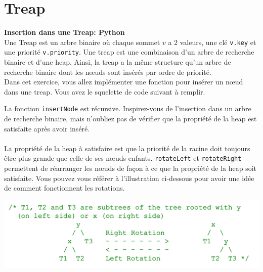 \section{Treap}
\begin{Exercice}[20 minutes]\textbf{Insertion dans une Treap: Python} \optionnel\\
    Une Treap est un arbre binaire où chaque sommet $v$ a 2 valeurs, une clé \lstinline{v.key} et une priorité \lstinline{v.priority}. Une treap est une
    combinaison d'un arbre de recherche binaire et d'une heap. Ainsi, la treap a la même structure qu'un arbre de recherche binaire dont les nœuds sont
    insérés par ordre de priorité. \\

    Dans cet exercice, vous allez implémenter une fonction pour insérer un nœud dans une treap. Vous avez le squelette de code suivant à remplir.
    

    \begin{conseil}
        La fonction \lstinline{insertNode} est récursive. Inspirez-vous de l'insertion dans un arbre de recherche binaire, mais 
        n'oubliez pas de vérifier que la propriété de la heap est satisfaite après avoir inséré. \\\\
        La propriété de la heap à satisfaire est que la priorité de la racine doit toujours être plus grande que celle de ses nœuds enfants.
        \lstinline{rotateLeft} et \lstinline{rotateRight} permettent de réarranger les nœuds de façon à ce que la propriété
        de la heap soit satisfaite. Vous pouvez vous référer à l'illustration ci-dessous pour avoir une idée de comment fonctionnent les rotations.
    \end{conseil}

    \begin{center}
        \includegraphics[width=\linewidth]{treap_heap_property.png}
    \end{center}

    \begin{solution}
    
    \end{solution}
    \begin{solution}
        
    \end{solution}
    
\end{Exercice}




